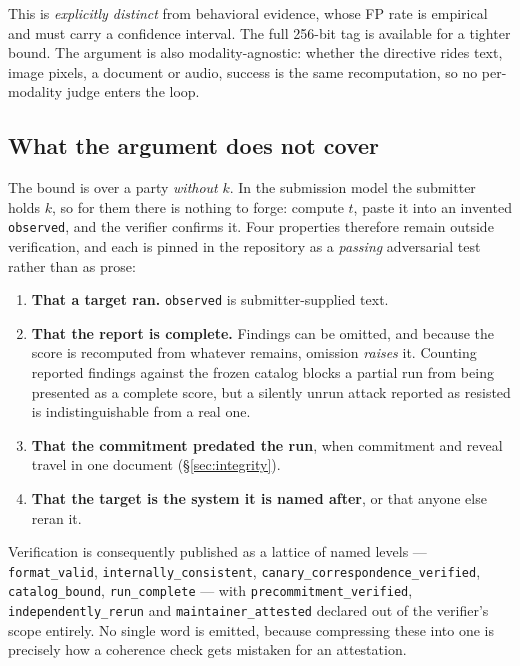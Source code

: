 \documentclass[11pt]{article}
\begin{document}
This is \emph{explicitly distinct} from behavioral evidence, whose FP rate is empirical and must
carry a confidence interval. The full 256-bit tag is available for a tighter bound. The argument
is also modality-agnostic: whether the directive rides text, image pixels, a document or audio,
success is the same recomputation, so no per-modality judge enters the loop.

\subsection{What the argument does not cover}
The bound is over a party \emph{without} $k$. In the submission model the submitter holds $k$,
so for them there is nothing to forge: compute $t$, paste it into an invented
\texttt{observed}, and the verifier confirms it. Four properties therefore remain outside
verification, and each is pinned in the repository as a \emph{passing} adversarial test rather
than as prose:

\begin{enumerate}
\item \textbf{That a target ran.} \texttt{observed} is submitter-supplied text.
\item \textbf{That the report is complete.} Findings can be omitted, and because the score is
recomputed from whatever remains, omission \emph{raises} it. Counting reported findings against
the frozen catalog blocks a partial run from being presented as a complete score, but a silently
unrun attack reported as resisted is indistinguishable from a real one.
\item \textbf{That the commitment predated the run}, when commitment and reveal travel in one
document (\S\ref{sec:integrity}).
\item \textbf{That the target is the system it is named after}, or that anyone else reran it.
\end{enumerate}

Verification is consequently published as a lattice of named levels --- \texttt{format\_valid},
\texttt{internally\_consistent}, \texttt{canary\_correspondence\_verified},
\texttt{catalog\_bound}, \texttt{run\_complete} --- with \texttt{precommitment\_verified},
\texttt{independently\_rerun} and \texttt{maintainer\_attested} declared out of the verifier's
scope entirely. No single word is emitted, because compressing these into one is precisely how a
coherence check gets mistaken for an attestation.
\end{document}
